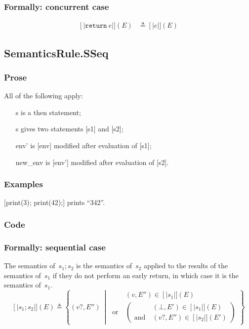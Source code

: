 \documentclass{book}
\newcommand\syntt[1]{\mathtt{#1}}
\newcommand\llbracket{[|}
\newcommand\rrbracket{|]}
\newcommand\interp[1]{\left\llbracket #1 \right\rrbracket}
\newcommand\st[0]{\ \middle|\ }
\begin{document}
  \subsubsection{Formally: concurrent case}
  \begin{align}
  \interp{\syntt{return}\ e} (E) & \triangleq \interp{e} (E)
  \label{eq:sem-ndet-sreturn}
  \end{align} 

\subsection{SemanticsRule.SSeq \label{sec:SemanticsRule.SSeq}}

  \subsubsection{Prose}
  All of the following apply:
  \begin{itemize}
  \item [s] is a then statement;
  \item [s] gives two statements [s1] and [s2];
  \item [env'] is [env] modified after evaluation of [s1];
  \item [new\_env] is [env'] modified after evaluation of [s2].
  \end{itemize}

  \subsubsection{Examples}
  [print(3); print(42);] prints ``342''.

  \subsubsection{Code}

  \subsubsection{Formally: sequential case}
  The semantics of~$s_1; s_2$ is the semantics of~$s_2$ applied to the results
  of the semantics of~$s_1$ if they do not perform an early return, in which
  case it is the semantics of~$s_1$.
  \begin{equation}
    \interp{s_1; s_2} (E) \triangleq
      \left\{ (v?, E'') \st{}
      \begin{aligned}
        & (v, E'') \in \interp{s_1} (E)
        \\ \text{or}\ &
        \left(
        \begin{aligned}
            & (\bot{}, E') \in \interp{s_1} (E)
            \\ \text{and}\ &
            (v?, E'') \in \interp{s_2} (E')
        \end{aligned}
        \right)
      \end{aligned}
      \right\}
    \label{eq:sem-det-sseq}
  \end{equation}
\end{document}
